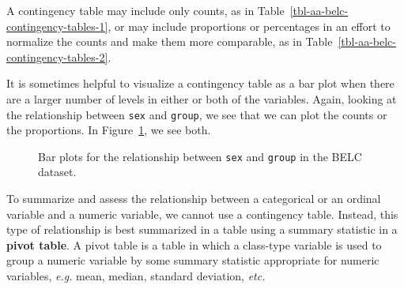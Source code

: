 \documentclass[
  letterpaper,
  DIV=11,
  numbers=noendperiod]{scrreport}
\theoremstyle{definition}
\theoremstyle{remark}
\begin{document}
A contingency table may include only counts, as in
Table~\ref{tbl-aa-belc-contingency-tables-1}, or may include proportions
or percentages in an effort to normalize the counts and make them more
comparable, as in Table~\ref{tbl-aa-belc-contingency-tables-2}.

It is sometimes helpful to visualize a contingency table as a bar plot
when there are a larger number of levels in either or both of the
variables. Again, looking at the relationship between \texttt{sex} and
\texttt{group}, we see that we can plot the counts or the proportions.
In Figure~\ref{fig-aa-belc-bar-plots}, we see both.

\begin{figure}

\begin{minipage}[t]{0.50\linewidth}

{\centering 


}

\end{minipage}%
%
\begin{minipage}[t]{0.50\linewidth}

{\centering 


}

\end{minipage}%

\caption{\label{fig-aa-belc-bar-plots}Bar plots for the relationship
between \texttt{sex} and \texttt{group} in the BELC dataset.}

\end{figure}

To summarize and assess the relationship between a categorical or an
ordinal variable and a numeric variable, we cannot use a contingency
table. Instead, this type of relationship is best summarized in a table
using a summary statistic in a \textbf{pivot table}. A pivot table is a
table in which a class-type variable is used to group a numeric variable
by some summary statistic appropriate for numeric variables, \emph{e.g.}
mean, median, standard deviation, \emph{etc.}
\end{document}
